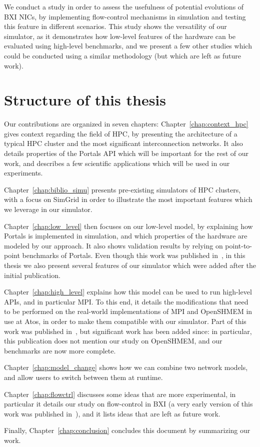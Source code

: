 We conduct a study in order to assess the usefulness of potential evolutions of
BXI NICs, by implementing flow-control mechanisms in simulation and testing this
feature in different scenarios. This study shows the versatility of our
simulator, as it demonstrates how low-level features of the hardware can be
evaluated using high-level benchmarks, and we present a few other studies which
could be conducted using a similar methodology (but which are left as future
work).

\section{Structure of this thesis}

Our contributions are organized in seven chapters:
Chapter~\ref{chap:context_hpc} gives context regarding the field of HPC, by
presenting the architecture of a typical HPC cluster and the most significant
interconnection networks. It also details properties of the Portals API which
will be important for the rest of our work, and describes a few scientific
applications which will be used in our experiments.

Chapter~\ref{chap:biblio_simu} presents pre-existing simulators of HPC clusters,
with a focus on SimGrid in order to illustrate the most important features which
we leverage in our simulator. 

Chapter~\ref{chap:low_level} then focuses on our
low-level model, by explaining how Portals is implemented in simulation, and
which properties of the hardware are modeled by our approach. It also shows
validation results by relying on point-to-point benchmarks of Portals. Even
though this work was published in~\cite{Emmanuel2020a}, in this thesis we also
present several features of our simulator which were added after the initial
publication. 

Chapter~\ref{chap:high_level} explains how this model can be used to run
high-level APIs, and in particular MPI. To this end, it details the
modifications that need to be performed on the real-world implementations of MPI
and OpenSHMEM in use at Atos, in order to make them compatible with our
simulator. Part of this work was published in~\cite{Emmanuel2021}, but
significant work has been added since: in particular, this publication does not
mention our study on OpenSHMEM, and our benchmarks are now more complete.

Chapter~\ref{chap:model_change} shows how we can combine two network models, and
allow users to switch between them at runtime. 

Chapter~\ref{chap:flowctrl}
discusses some ideas that are more experimental, in particular it details our
study on flow-control in BXI (a very early version of this work was published
in~\cite{Emmanuel2021}), and it lists ideas that are left as future work.

Finally, Chapter~\ref{chap:conclusion} concludes this document by summarizing
our work.
